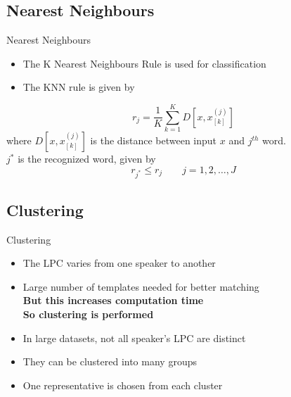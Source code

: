 \documentclass{beamer}
\begin{document}
\subsection{Nearest Neighbours}
\begin{frame}{Nearest Neighbours}
\begin{itemize}
	\item The K Nearest Neighbours Rule is used for classification
	\item The KNN rule is given by
\end{itemize}
\begin{equation}
	r_j = \frac{1}{K}\sum_{k=1}^K D[x,x^{(j)}_{[k]}]
\end{equation}
\quad where $D[x,x^{(j)}_{[k]}]$ is the distance between input $x$ and $j^{th}$ word.\\ \vspace{0.5cm}
\quad $j^*$ is the recognized word, given by
\begin{equation}
	r_{j^*} \leq r_j \qquad j = 1,2,\dots,J
\end{equation}
\end{frame}

\subsection{Clustering}
\begin{frame}{Clustering}
\begin{itemize}
	\item The LPC varies from one speaker to another
	\item Large number of templates needed for better matching \\ \vspace{0.5cm}
	\textbf{But this increases computation time\\So clustering is performed} \vspace{0.2cm}
	\item In large datasets, not all speaker's LPC are distinct
	\item They can be clustered into many groups
	\item One representative is chosen from each cluster
\end{itemize}
\end{frame}
\end{document}
